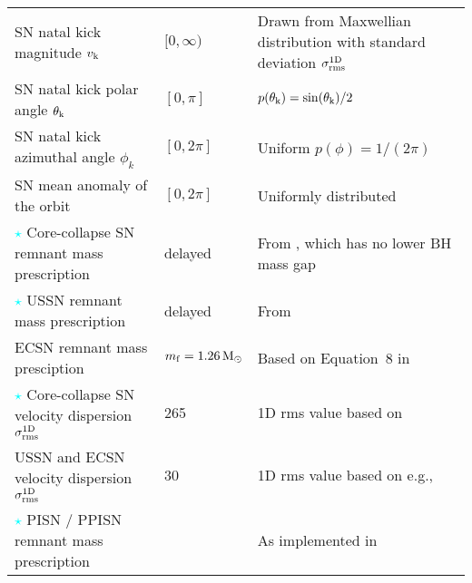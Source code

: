 \documentclass[fleqn,usenatbib]{mnras}
\newcommand{\vk}{\ensuremath{v_{\rm{k}}}\xspace}
\newcommand{\thetak}{\ensuremath{{\theta}_{\rm{k}}}\xspace}
\newcommand{\Msun}{\ensuremath{\,\rm{M}_{\odot}}\xspace}
\begin{document}
\begin{table*}
{\begin{tabular}{lll}
%
{SN} natal kick magnitude \vk                          									& $[0, \infty)$\kms & Drawn from Maxwellian distribution    with standard deviation $\sigma_{\rm{rms}}^{\rm{1D}}$          \\
%
 {SN} natal kick polar angle $\thetak$          											& $[0, \pi]$                        & $p(\thetak) = \sin(\thetak)/2$ \\
%
 {SN} natal kick azimuthal angle $\phi_k$                           					  	& $[0, 2\pi]$                        & Uniform $p(\phi) = 1/ (2 \pi)$   \\
%
 {SN} mean anomaly of the orbit                    											&     $[0, 2\pi]$                             & Uniformly distributed  \\
{\hspace{-.35cm}\Large{\textcolor{cyan}{$\star$}}}{\hspace{+.02cm}} Core-collapse  {SN} remnant mass prescription          									     &  delayed                     &  From \citep{2012ApJ...749...91F}, which  has no lower {BH} mass gap  \\%
%
{\hspace{-.35cm}\Large{\textcolor{cyan}{$\star$}}}{\hspace{+.02cm}} USSN  remnant mass prescription          									     &  delayed                     &  From \citep{2012ApJ...749...91F}   \\%
%
ECSN  remnant mass presciption                        												&                                 $m_{\rm{f}} = 1.26\Msun$ &      Based on Equation~8 in \citet{1996ApJ...457..834T}          \\
%
{\hspace{-.35cm}\Large{\textcolor{cyan}{$\star$}}}{\hspace{+.02cm}} Core-collapse  {SN}  velocity dispersion $\sigma_{\rm{rms}}^{\rm{1D}}$ 			& 265\kms           & 1D rms value based on              \citet{2005MNRAS.360..974H}                          \\
%
 USSN  and ECSN  velocity dispersion $\sigma_{\rm{rms}}^{\rm{1D}}$ 							 	& 30\kms             &            1D rms value based on e.g.,    \citet{2002ApJ...571L..37P,2004ApJ...612.1044P}    \\
%
{\hspace{-.35cm}\Large{\textcolor{cyan}{$\star$}}}{\hspace{+.02cm}} PISN / PPISN remnant mass prescription               											& \citet{2019ApJ...882...36M}                    &       As implemented in \citet{2019ApJ...882..121S}      \\

\end{tabular}}
\end{table*}
\end{document}
